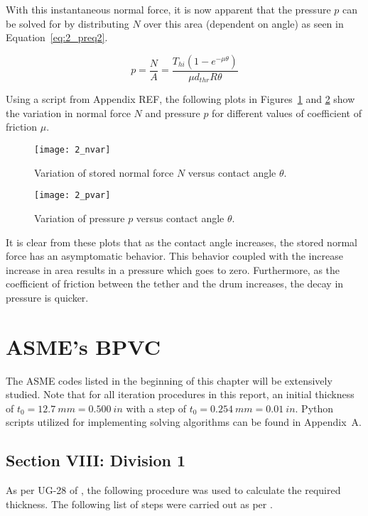 With this instantaneous normal force, it is now apparent that the pressure $p$ can be solved for by distributing $N$ over this area (dependent on angle) as seen in Equation~\ref{eq:2_preq2}.

\begin{equation}
	\label{eq:2_preq2}
	p=\frac{N}{A}= \frac{T_{hi} \left( 1 - e^{-\mu \theta} \right)}{\mu d_{thr} R \theta}
\end{equation}

Using a script from Appendix REF, the following plots in Figures~\ref{fig:2_nvar} and \ref{fig:2_pvar} show the variation in normal force $N$ and pressure $p$ for different values of coefficient of friction $\mu$.

\begin{figure}[H]
	\centering
	\texttt{[image: 2\_nvar]}
	\caption{Variation of stored normal force $N$ versus contact angle $\theta$.}
	\label{fig:2_nvar}
\end{figure}

\begin{figure}[H]
	\centering
	\texttt{[image: 2\_pvar]}
	\caption{Variation of pressure $p$ versus contact angle $\theta$.}
	\label{fig:2_pvar}
\end{figure}

It is clear from these plots that as the contact angle increases, the stored normal force has an asymptomatic behavior. This behavior coupled with the increase increase in area results in a pressure which goes to zero. Furthermore, as the coefficient of friction between the tether and the drum increases, the decay in pressure is quicker.  

\section{ASME's BPVC}

The ASME codes listed in the beginning of this chapter will be extensively studied. Note that for all iteration procedures in this report, an initial thickness of $t_0 = 12.7\ mm=0.500\ in$ with a step of $t_0 = 0.254\ mm=0.01\ in$. Python scripts utilized for implementing solving algorithms can be found in Appendix~A.
\subsection{Section VIII: Division 1}
As per UG-28 of \citep{ASMEbvpcVII1}, the following procedure was used to calculate the required thickness.
The following list of steps were carried out as per \citep{ASMEbvpcVII1}.


